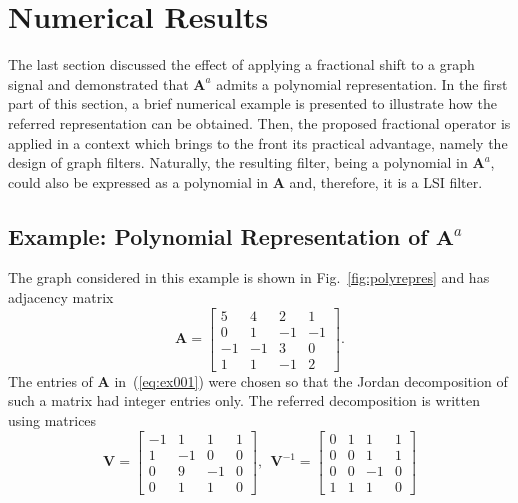 \section{Numerical Results}\label{sec:num}
The last section discussed the effect of applying a fractional shift to a graph signal and demonstrated that $\mathbf{A}^a$ admits a polynomial representation. In the first part of this section, a brief numerical example is presented to illustrate how the referred representation can be obtained. Then, the proposed fractional operator is applied in a context which brings to the front its practical advantage, namely the design of graph filters. Naturally, the resulting filter, being a polynomial in $\mathbf{A}^a$, could also be expressed as a polynomial in $\mathbf{A}$ and, therefore, it is a LSI filter.

\subsection{Example: Polynomial Representation of $\mathbf{A}^{a}$}\label{subsec:num1}
The graph considered in this example is shown in Fig.~\ref{fig:polyrepres} and has adjacency matrix
\begin{equation}\label{eq:ex001}
\mathbf{A}=\left[\begin{array}{ccccc}
5 & 4 & 2 & 1 \\
0 & 1 & -1 & -1\\
-1 & -1 & 3 & 0\\
1 & 1 & -1 & 2
\end{array}\right].
\end{equation}
The entries of $\mathbf{A}$ in~(\ref{eq:ex001}) were chosen so that the Jordan decomposition of such a matrix had integer entries only. The referred decomposition is written using matrices
\begin{equation}\nonumber
\mathbf{V}=\left[\begin{array}{ccccc}
-1 & 1&1&1\\
1&-1&0&0\\
0&9&-1&0\\
0&1&1&0
\end{array}\right],\:\:
\mathbf{V}^{-1}=\left[\begin{array}{ccccc}
0&1&1&1\\
0&0&1&1\\
0&0&-1&0\\
1&1&1&0
\end{array}\right]
\end{equation}
